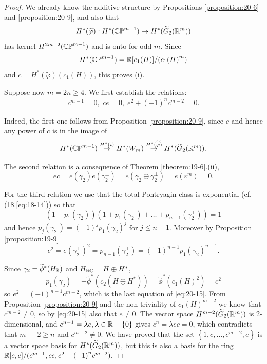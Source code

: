 \begin{proof}
  We already know the additive structure by Propositions \ref{proposition:20-6} and \ref{proposition:20-9}, 
  and also that
  \[
    H^*( \widetilde{\varphi })  : H^*( {\mathbb{CP}}^{m- 1})  \rightarrow  H^*( {\widetilde{G}_{2}( {{\mathbb{R}}^m}) })
  \]
  has kernel $H^{{2m}- 2}( {\mathbb{CP}}^{m- 1})$ and is onto for odd $m$. Since
  \[
    H^*( {\mathbb{CP}}^{m- 1})  = {\mathbb{R}}[  {{c}_{1}( H) }]  /( {{c}_{1}{( H) }^{m}})
  \]
  and $c = H^*( \widetilde{\varphi }) ( {{c}_{1}( H) })$, this proves (i).
  
  Suppose now $m = {2n} \geq  4$. We first establish the relations:
  \begin{align}\label{eq:20-15}
    {c}^{m- 1} = 0,\;{ce} = 0,\;{e}^{2} + {(-1) }^{n}{c}^{m- 2} = 0.
  \end{align}
  
  Indeed, the first one follows from Proposition \ref{proposition:20-9}, since $c$ and hence any power of $c$ is in the image of
  \[
    H^*( {\mathbb{CP}}^{m- 1}) 
    \overset{H^*( i) }{ \rightarrow  }
    H^*( {W}_{m}) 
    \overset{H^*( \widetilde{\varphi }) }{ \rightarrow  }
    H^*( {\widetilde{G}_{2}( {{\mathbb{R}}}^{m}) }).
  \]
  
  The second relation is a consequence of Theorem \ref{theorem:19-6}.(ii),
  \[
    {ec} 
    = e( {\gamma }_{2}) e( {\gamma }_{2}^{ \bot  })  
    = e( {{\gamma }_{2} \oplus  {\gamma }_{2}^{ \bot  }})  
    = e( {\varepsilon }^{m})  
    = 0.
  \]
  
  For the third relation we use that the total Pontryagin class is exponential (cf. (18.\ref{eq:18-14})) so that
  \[
    ( {1 + {p}_{1}( {\gamma }_{2}) }) 
    ( 
      {1 + {p}_{1}( {\gamma }_{2}^{ \bot  })  
      + \ldots  + {p}_{n- 1}( {\gamma }_{2}^{ \bot  }) }
    ) = 1
  \]
  and hence ${p}_{j}( {\gamma }_{2}^{ \bot  })  = {(-1) }^{j}{p}_{1}{( {\gamma }_{2}) }^{j}$ for $j \leq  n- 1$. 
  Moreover by Proposition \ref{proposition:19-9}
  \[
    {e}^{2} 
    = e{( {\gamma }_{2}^{ \bot  }) }^{2} 
    = {p}_{n- 1}( {\gamma }_{2}^{ \bot  })  
    = {(-1) }^{n- 1}{p}_{1}{( {\gamma }_{2}) }^{n- 1}.
  \]
  
  Since ${\gamma }_{2} = {\widetilde{\phi }}^*( H_{{\mathbb{R}}})$ and $H_{{\mathbb{R}}{\mathbb{C}}} = H \oplus  H^*$,
  \[
    {p}_{1}( {\gamma }_{2})  
    = - {\widetilde{\phi }}^*( {{c}_{2}( {H \oplus  H^*}) })  
    = {\widetilde{\phi }}^*( {{c}_{1}{( H) }^{2}})  
    = {c}^{2}
  \]
  so ${e}^{2} = {(-1) }^{n- 1}{c}^{m- 2}$, which is the last equation of \eqref{eq:20-15}. From Proposition \ref{proposition:20-9} 
  and the non-triviality of ${c}_{1}{( H) }^{m- 2}$ we know that ${c}^{m- 2} \neq  0$, so by \eqref{eq:20-15} also 
  that $e \neq  0$. The vector space $H^{m- 2}( {\widetilde{G}_{2}( {{\mathbb{R}}^m}) })$ is 2-dimensional, 
  and ${c}^{n- 1} = {\lambda e},\lambda  \in  {\ensuremath{\mathbb{R}}}- \{ 0\}$ gives ${c}^{n} = {\lambda ec} = 0$, which contradicts 
  that $m-$  $2 \geq  n$ and ${c}^{m- 2} \neq  0$. We have proved that the set $\left\{  {1,c,\ldots,{c}^{m- 2},e}\right\}$ 
  is a vector space basis for $H^*( {\widetilde{G}_{2}( {{\mathbb{R}}^m}) })$, but this is also a basis for the 
  ring $\mathbb{R}[  {c,e}]  /( {{c}^{m- 1},{ce},{e}^{2} + {(-1) }^{n}{c}^{m- 2}}).$
\end{proof}



